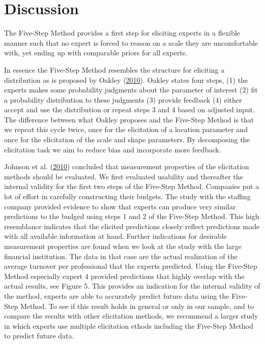 \documentclass[openright,titlepage,12pt,a4paper]{book}
\begin{document}
\hypertarget{ch02discussion}{%
\section{Discussion}\label{ch02discussion}}

The Five-Step Method provides a first step for eliciting experts in a flexible manner such that no expert is forced to reason on a scale they are uncomfortable with, yet ending up with comparable priors for all experts.

In essence the Five-Step Method resembles the structure for eliciting a distribution as is proposed by Oakley (\protect\hyperlink{ref-oakley_eliciting_2010}{2010}). Oakley states four steps, (1) the experts makes some probability judgments about the parameter of interest (2) fit a probability distribution to these judgments (3) provide feedback (4) either accept and use the distribution or repeat steps 3 and 4 based on adjusted input. The difference between what Oakley proposes and the Five-Step Method is that we repeat this cycle twice, once for the elicitation of a location parameter and once for the elicitation of the scale and shape parameters. By decomposing the elicitation task we aim to reduce bias and incorporate more feedback.

Johnson et al. (\protect\hyperlink{ref-johnson_methods_2010}{2010}) concluded that measurement properties of the elicitation methods should be evaluated. We first evaluated usability and thereafter the internal validity for the first two steps of the Five-Step Method. Companies put a lot of effort in carefully constructing their budgets. The study with the staffing company provided evidence to show that experts can produce very similar predictions to the budged using steps 1 and 2 of the Five-Step Method. This high resemblance indicates that the elicited predictions closely reflect predictions made with all available information at hand. Further indications for desirable measurement properties are found when we look at the study with the large financial institution. The data in that case are the actual realization of the average turnover per professional that the experts predicted. Using the Five-Step Method especially expert 4 provided predictions that highly overlap with the actual results, see Figure 5. This provides an indication for the internal validity of the method, experts are able to accurately predict future data using the Five-Step Method. To see if this result holds in general or only in our sample, and to compare the results with other elicitation methods, we recommend a larger study in which experts use multiple elicitation ethods including the Five-Step Method to predict future data.
\end{document}
